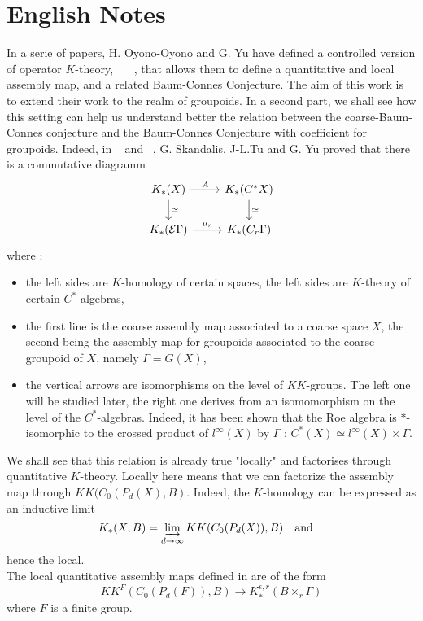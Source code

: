 \section{English Notes}

In a serie of papers, H. Oyono-Oyono and G. Yu have defined a controlled version of operator $K$-theory, ~\cite{OY1}~\cite{OY2}~\cite{OY3}, that allows them to define a quantitative and local assembly map, and a related Baum-Connes Conjecture. The aim of this work is to extend their work to the realm of groupoids. In a second part, we shall see how this setting can help us understand better the relation between the coarse-Baum-Connes conjecture and the Baum-Connes Conjecture with coefficient for groupoids. Indeed, in ~\cite{TuBC} and ~\cite{SkTuYu}, G. Skandalis, J-L.Tu and G. Yu proved that there is a commutative diagramm
\[\begin{tikzcd}
K_*(X) \arrow{r}{A}\arrow{d}{\simeq} & K_*(C^*X)\arrow{d}{\simeq} \\
K_*(\mathcal E \Gamma)\arrow{r}{\mu_r} & K_*(C_r \Gamma)
\end{tikzcd}\]
where :
\begin{itemize}
\item the left sides are $K$-homology of certain spaces, the left sides are $K$-theory of certain $C^*$-algebras,
\item the first line is the coarse assembly map associated to a coarse space $X$, the second being the assembly map for groupoids associated to the coarse groupoid of $X$, namely $\Gamma = G(X)$,
\item the vertical arrows are isomorphisms on the level of $KK$-groups. The left one will be studied later, the right one derives from an isomomorphism on the level of the $C^*$-algebras. Indeed, it has been shown that the Roe algebra is $*$-isomorphic to the crossed product of $l^\infty (X)$ by $\Gamma$ : $C^*(X) \simeq l^\infty(X)\times \Gamma$.\\
\end{itemize}

We shall see that this relation is already true "locally" and factorises through quantitative $K$-theory. Locally here means that we can factorize the assembly map through $KK(C_0(P_d(X),B)$. Indeed, the $K$-homology can be expressed as an inductive limit 
\[K_*(X,B)=\varinjlim_{d\rightarrow \infty}  KK(C_0(P_d(X)), B ) \quad \text{and}\quad\] 
hence the local. \\

The local quantitative assembly maps defined in \cite{OY2} are of the form
\[KK^F(C_0(P_d(F)), B  ) \rightarrow K^{\epsilon, r}_*(B\times_r \Gamma)\]
where $F$ is a finite group. \\

